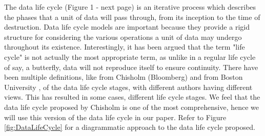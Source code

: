 \documentclass{sigchi}
\begin{document}
The data life cycle (Figure 1 - next page) is an iterative process which describes the phases that a unit of data will pass through, from its inception to the time of destruction. Data life cycle models are important because they provide a rigid structure for considering the various operations a unit of data may undergo throughout its existence. Interestingly, it has been argued that the term "life cycle" is not actually the most appropriate term, as unlike in a regular life cycle of say, a butterfly, data will not reproduce itself to ensure continuity. There have been multiple definitions, like from Chisholm (Bloomberg) \cite{11_chisholm_2015} and from Boston University \cite{bostonDataLifeCycle}, of the data life cycle stages, with different authors having different views. This has resulted in some cases, different life cycle stages. We feel that the data life cycle proposed by Chisholm is one of the most comprehensive, hence we will use this version of the data life cycle in our paper. Refer to Figure \ref{fig:DataLifeCycle} for a diagrammatic approach to the data life cycle proposed.
\end{document}
